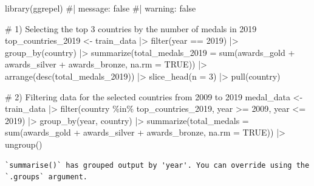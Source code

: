 \documentclass[
  letterpaper,
  DIV=11,
  numbers=noendperiod]{scrartcl}
\newenvironment{Shaded}{\begin{snugshade}}{\end{snugshade}}
\newcommand{\AttributeTok}[1]{\textcolor[rgb]{0.40,0.45,0.13}{#1}}
\newcommand{\CommentTok}[1]{\textcolor[rgb]{0.37,0.37,0.37}{#1}}
\newcommand{\ConstantTok}[1]{\textcolor[rgb]{0.56,0.35,0.01}{#1}}
\newcommand{\DecValTok}[1]{\textcolor[rgb]{0.68,0.00,0.00}{#1}}
\newcommand{\FunctionTok}[1]{\textcolor[rgb]{0.28,0.35,0.67}{#1}}
\newcommand{\NormalTok}[1]{\textcolor[rgb]{0.00,0.23,0.31}{#1}}
\newcommand{\OtherTok}[1]{\textcolor[rgb]{0.00,0.23,0.31}{#1}}
\newcommand{\SpecialCharTok}[1]{\textcolor[rgb]{0.37,0.37,0.37}{#1}}
\begin{document}
\begin{Shaded}
\begin{Highlighting}[]
\FunctionTok{library}\NormalTok{(ggrepel)}
\CommentTok{\#| message: false}
\CommentTok{\#| warning: false}

\CommentTok{\# 1) Selecting the top 3 countries by the number of medals in 2019}
\NormalTok{top\_countries\_2019 }\OtherTok{\textless{}{-}}\NormalTok{ train\_data }\SpecialCharTok{|\textgreater{}}
  \FunctionTok{filter}\NormalTok{(year }\SpecialCharTok{==} \DecValTok{2019}\NormalTok{) }\SpecialCharTok{|\textgreater{}}
  \FunctionTok{group\_by}\NormalTok{(country) }\SpecialCharTok{|\textgreater{}}
  \FunctionTok{summarize}\NormalTok{(}\AttributeTok{total\_medals\_2019 =} \FunctionTok{sum}\NormalTok{(awards\_gold }\SpecialCharTok{+}\NormalTok{ awards\_silver }\SpecialCharTok{+}\NormalTok{ awards\_bronze, }\AttributeTok{na.rm =} \ConstantTok{TRUE}\NormalTok{)) }\SpecialCharTok{|\textgreater{}}
  \FunctionTok{arrange}\NormalTok{(}\FunctionTok{desc}\NormalTok{(total\_medals\_2019)) }\SpecialCharTok{|\textgreater{}}
  \FunctionTok{slice\_head}\NormalTok{(}\AttributeTok{n =} \DecValTok{3}\NormalTok{) }\SpecialCharTok{|\textgreater{}}
  \FunctionTok{pull}\NormalTok{(country)}

\CommentTok{\# 2) Filtering data for the selected countries from 2009 to 2019}
\NormalTok{medal\_data }\OtherTok{\textless{}{-}}\NormalTok{ train\_data }\SpecialCharTok{|\textgreater{}}
  \FunctionTok{filter}\NormalTok{(country }\SpecialCharTok{\%in\%}\NormalTok{ top\_countries\_2019, year }\SpecialCharTok{\textgreater{}=} \DecValTok{2009}\NormalTok{, year }\SpecialCharTok{\textless{}=} \DecValTok{2019}\NormalTok{) }\SpecialCharTok{|\textgreater{}}
  \FunctionTok{group\_by}\NormalTok{(year, country) }\SpecialCharTok{|\textgreater{}}
  \FunctionTok{summarize}\NormalTok{(}\AttributeTok{total\_medals =} \FunctionTok{sum}\NormalTok{(awards\_gold }\SpecialCharTok{+}\NormalTok{ awards\_silver }\SpecialCharTok{+}\NormalTok{ awards\_bronze, }\AttributeTok{na.rm =} \ConstantTok{TRUE}\NormalTok{)) }\SpecialCharTok{|\textgreater{}}
  \FunctionTok{ungroup}\NormalTok{()}
\end{Highlighting}
\end{Shaded}

\begin{verbatim}
`summarise()` has grouped output by 'year'. You can override using the
`.groups` argument.
\end{verbatim}
\end{document}
